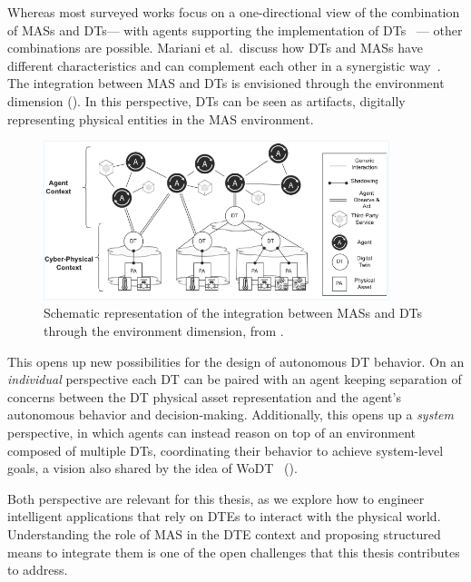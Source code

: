 Whereas most surveyed works focus on a one-directional view of the combination of \acp{MAS} and \acp{DT}--- with agents supporting the implementation of \acp{DT}~\cite{Kalyani_Collier_2024} --- other combinations are possible. 
%
Mariani et al.\ discuss how \acp{DT} and \acp{MAS} have different characteristics and can complement each other in a synergistic way~\cite{Mariani_Picone_Ricci_2022}.
%
The integration between \ac{MAS} and \acp{DT} is envisioned through the environment dimension ().
%
In this perspective, \acp{DT} can be seen as artifacts, digitally representing physical entities in the \ac{MAS} environment.

\begin{figure}
    \centering
    \includegraphics[width=0.9\textwidth]{figures/agent-dt-overview.pdf}
    \caption{Schematic representation of the integration between \acp{MAS} and \acp{DT} through the environment dimension, from \cite{Mariani_Picone_Ricci_2022}.}
    \label{fig:mas-dt-integration}
\end{figure}

This opens up new possibilities for the design of autonomous \ac{DT} behavior.
%
On an \emph{individual} perspective each \ac{DT} can be paired with an agent keeping separation of concerns between the \ac{DT} physical asset representation and the agent's autonomous behavior and decision-making. 
%
Additionally, this opens up a \emph{system} perspective, in which agents can instead reason on top of an environment composed of multiple \acp{DT}, coordinating their behavior to achieve system-level goals, a vision also shared by the idea of \ac{WoDT}~\cite{web-of-dt-ricci-2022} ().

Both perspective are relevant for this thesis, as we explore how to engineer intelligent applications that rely on \acp{DTE} to interact with the physical world. 
%
Understanding the role of \ac{MAS} in the \ac{DTE} context and proposing structured means to integrate them is one of the open challenges that this thesis contributes to address.


